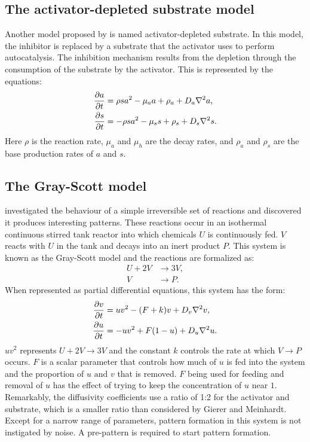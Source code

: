 \subsection{The activator-depleted substrate model}
Another model proposed by \citet{gierer1972} is named activator-depleted substrate. In this model, the inhibitor is replaced by a substrate that the activator uses to perform autocatalysis. The inhibition mechanism results from the depletion through the consumption of the substrate by the activator. This is represented by the equations:
	\begin{equation}
	\begin{aligned} \label{eq:activatorSubstrateRD}
		\frac{\partial a}{\partial t} &= \rho sa^2 - \mu_a a + \rho_a + D_a \nabla^2 a,\\
		\frac{\partial s}{\partial t} &= -\rho sa^2 - \mu_s s + \rho_s + D_s \nabla^2 s.
	\end{aligned}
	\end{equation}
Here $\rho$ is the reaction rate, $\mu_a$ and $\mu_h$ are the decay rates, and $\rho_a$ and $\rho_s$ are the base production rates of $a$ and $s$.

\subsection{The Gray-Scott model}
\citet{gray1984} investigated the behaviour of a simple irreversible set of reactions and discovered it produces interesting patterns. These reactions occur in an isothermal continuous stirred tank reactor into which chemicals $U$ is continuously fed. $V$ reacts with $U$ in the tank and decays into an inert product $P$. This system is known as the Gray-Scott model and the reactions are formalized as:
	\begin{equation}
	\begin{aligned}
		U + 2V &\to 3V, \\
		V &\to P.
	\end{aligned}
	\end{equation}
When represented as partial differential equations, this system has the form:
	\begin{equation}
	\begin{aligned} \label{eq:grayscottRD}
		\frac{\partial v}{\partial t} &= uv^2 - (F+k)v + D_v \nabla^2 v,\\
		\frac{\partial u}{\partial t} &= -uv^2 + F(1-u) + D_u \nabla^2 u.
	\end{aligned}
	\end{equation}
$uv^2$ represents $U + 2V \to 3V$ and the constant $k$ controls the rate at which $V \to P$ occurs. $F$ is a scalar parameter that controls how much of $u$ is fed into the system and the proportion of $u \text{ and } v$ that is removed. $F$ being used for feeding and removal of $u$ has the effect of trying to keep the concentration of $u$ near $1$. Remarkably, the diffusivity coefficients use a ratio of 1:2 for the activator and substrate, which is a smaller ratio than considered by Gierer and Meinhardt. Except for a narrow range of parameters, pattern formation in this system is not instigated by noise. A pre-pattern is required to start pattern formation. 

